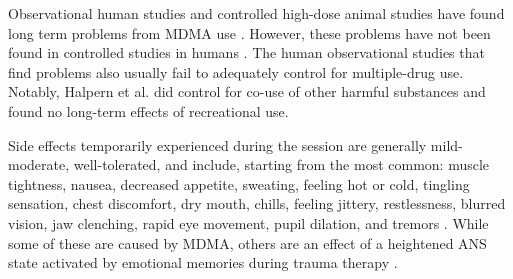 \documentclass[12pt,letterpaper]{article}
\begin{document}
Observational human studies and controlled high-dose animal studies have found long term problems from MDMA use \cite{baumannRats}. However, these problems have not been found in controlled studies in humans \cite{halpernMormonRavers}. The human observational studies that find problems also usually fail to adequately control for multiple-drug use. Notably, Halpern et al. did control for co-use of other harmful substances and found no long-term effects of recreational use. 

Side effects temporarily experienced during the session are generally mild-moderate, well-tolerated, and include, starting from the most common: muscle tightness, nausea, decreased appetite, sweating, feeling hot or cold, tingling sensation, chest discomfort, dry mouth, chills, feeling jittery, restlessness, blurred vision, jaw clenching, rapid eye movement, pupil dilation, and tremors \cite{mitchellMDMAClinicalTrial2}. While some of these are caused by MDMA, others are an effect of a heightened ANS state activated by emotional memories during trauma therapy \cite{kozlowskaDefenseCascade}.

\vspace{\baselineskip}
\end{document}
